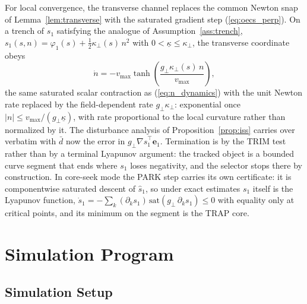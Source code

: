 \documentclass[lettersize,journal]{IEEEtran}
\begin{document}
For local convergence, the transverse channel replaces the common
Newton snap of Lemma~\ref{lem:transverse} with the saturated gradient
step (\ref{eq:oecs_perp}). On a trench of $s_1$ satisfying the analogue
of Assumption~\ref{ass:trench}, $s_1(s, n) = \varphi_1(s) +
\tfrac{1}{2}\kappa_\perp(s)\,n^2$ with $0 < \underline{\kappa} \leq
\kappa_\perp$, the transverse coordinate obeys
\begin{equation}
    \dot{n} = -v_{\max}\tanh\!\left(
    \frac{g_\perp \kappa_\perp(s)\,n}{v_{\max}}\right),
    \label{eq:oecs_n_dynamics}
\end{equation}
the same saturated scalar contraction as (\ref{eq:n_dynamics}) with the
unit Newton rate replaced by the field-dependent rate $g_\perp
\kappa_\perp$: exponential once $|n| \leq v_{\max}/(g_\perp
\underline{\kappa})$, with rate proportional to the local curvature
rather than normalized by it. The disturbance analysis of
Proposition~\ref{prop:iss} carries over verbatim with $\bar{d}$ now the
error in $g_\perp \nabla\hat{s}_1^\top\mathbf{e}_1$. Termination is by
the TRIM test rather than by a terminal Lyapunov argument: the tracked
object is a bounded curve segment that ends where $s_1$ loses
negativity, and the selector stops there by construction. In core-seek
mode the PARK step carries its own certificate: it is componentwise
saturated descent of $\hat{s}_1$, so under exact estimates $s_1$ itself
is the Lyapunov function, $\dot{s}_1 = -\sum_k (\partial_k s_1)\,
\mathrm{sat}(g_\perp\,\partial_k s_1) \leq 0$ with equality only at
critical points, and its minimum on the segment is the TRAP core.


\section{Simulation Program}
\label{sec:methods}

\subsection{Simulation Setup}
\end{document}
